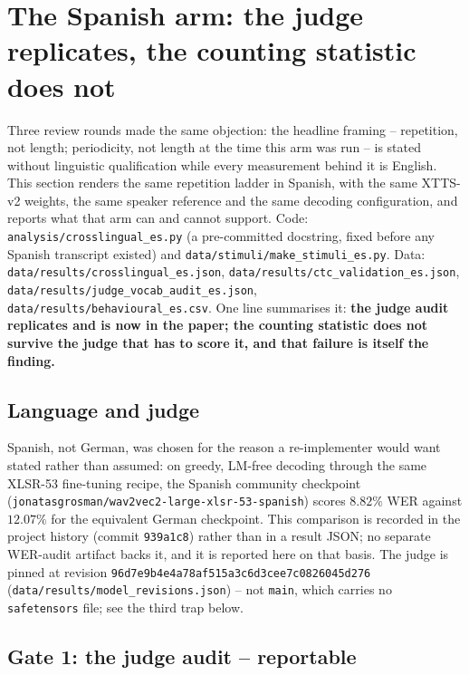 \documentclass[11pt]{article}
\begin{document}
\section{The Spanish arm: the judge replicates, the counting statistic does not}
\label{sec:s27}

Three review rounds made the same objection: the headline framing --
repetition, not length; periodicity, not length at the time this arm was run --
is stated without linguistic qualification while every measurement behind it is
English. This section renders the same
repetition ladder in Spanish, with the same XTTS-v2 weights, the same speaker
reference and the same decoding configuration, and reports what that arm can
and cannot support. Code: \texttt{analysis/crosslingual\_es.py} (a
pre-committed docstring, fixed before any Spanish transcript existed) and
\texttt{data/stimuli/make\_stimuli\_es.py}. Data:
\texttt{data/results/crosslingual\_es.json},
\texttt{data/results/ctc\_validation\_es.json},
\texttt{data/results/judge\_vocab\_audit\_es.json},
\texttt{data/results/behavioural\_es.csv}. One line summarises it: \textbf{the
judge audit replicates and is now in the paper; the counting statistic does
not survive the judge that has to score it, and that failure is itself the
finding.}

\subsection{Language and judge}

Spanish, not German, was chosen for the reason a re-implementer would want
stated rather than assumed: on greedy, LM-free decoding through the same
XLSR-53 fine-tuning recipe, the Spanish community checkpoint
(\texttt{jonatasgrosman/wav2vec2-large-xlsr-53-spanish}) scores $8.82\%$ WER
against $12.07\%$ for the equivalent German checkpoint. This comparison is
recorded in the project history (commit \texttt{939a1c8}) rather than in a
result JSON; no separate WER-audit artifact backs it, and it is reported here
on that basis. The judge is pinned at revision
\texttt{96d7e9b4e4a78af515a3c6d3cee7c0826045d276}
(\texttt{data/results/model\_revisions.json}) -- not \texttt{main}, which
carries no \texttt{safetensors} file; see the third trap below.

\subsection{Gate 1: the judge audit -- reportable}
\end{document}
